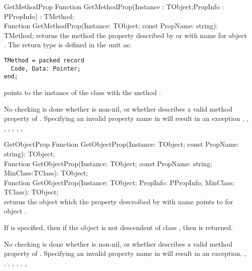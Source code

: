 \begin{function}{GetMethodProp}
\Declaration
Function GetMethodProp(Instance : TObject;PropInfo : PPropInfo) : TMethod;\\
Function GetMethodProp(Instance: TObject; const PropName: string): TMethod;
\Description
{} returns the method the property described by
 or with name  for object .
The return type  is defined in the  unit as:
\begin{verbatim}
TMethod = packed record
  Code, Data: Pointer;
end;                                                                         
\end{verbatim}
 points to the instance of the class with the method .

\Errors
No checking is done whether  is non-nil, or whether
 describes a valid method property of .
Specifying an invalid property name in  will result in an
 exception
\SeeAlso
{}, , ,
, , ,
, 
\end{function}


\begin{function}{GetObjectProp}
\Declaration
Function GetObjectProp(Instance: TObject; const PropName: string): TObject;\\
Function GetObjectProp(Instance: TObject; const PropName: string; MinClass:TClass): TObject; \\
Function GetObjectProp(Instance: TObject; PropInfo: PPropInfo; MinClass: TClass):
TObject;\\
\Description
{} returns the object which the property descroibed by
 with name  points to for object .

If  is specified, then if the object is not descendent of
class , then  is returned.

\Errors
No checking is done whether  is non-nil, or whether
 describes a valid method property of . 
Specifying an invalid property name in  will result in an
 exception.
\SeeAlso
{}, , ,
, , ,
, 
\end{function}

